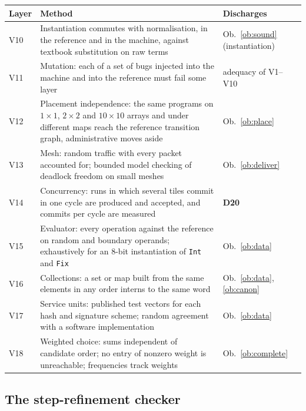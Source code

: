 \documentclass[11pt]{article}
\newcommand{\kw}[1]{\texttt{#1}}
\newcommand{\dec}[1]{\textbf{D#1}}
\theoremstyle{definition}
\theoremstyle{remark}
\begin{document}
\medskip\noindent
\begin{tabularx}{\textwidth}{@{}l X X@{}}
\toprule
Layer & Method & Discharges\\
\midrule
V10 & Instantiation commutes with normalisation, in the reference and in the
     machine, against textbook substitution on raw terms
     & Ob.~\ref{ob:sound} (instantiation)\\
V11 & Mutation: each of a set of bugs injected into the machine and into the
     reference must fail some layer & adequacy of V1--V10\\
V12 & Placement independence: the same programs on $1 \times 1$,
     $2 \times 2$ and $10 \times 10$ arrays and under different maps reach the
     reference transition graph, administrative moves aside
     & Ob.~\ref{ob:place}\\
V13 & Mesh: random traffic with every packet accounted for; bounded model
     checking of deadlock freedom on small meshes & Ob.~\ref{ob:deliver}\\
V14 & Concurrency: runs in which several tiles commit in one cycle are
     produced and accepted, and commits per cycle are measured
     & \dec{20}\\
V15 & Evaluator: every operation against the reference on random and
     boundary operands; exhaustively for an 8-bit instantiation of \kw{Int}
     and \kw{Fix} & Ob.~\ref{ob:data}\\
V16 & Collections: a set or map built from the same elements in any order
     interns to the same word & Ob.~\ref{ob:data}, \ref{ob:canon}\\
V17 & Service units: published test vectors for each hash and signature
     scheme; random agreement with a software implementation & Ob.~\ref{ob:data}\\
V18 & Weighted choice: sums independent of candidate order; no entry of
     nonzero weight is unreachable; frequencies track weights & Ob.~\ref{ob:complete}\\
\bottomrule
\end{tabularx}

\subsection{The step-refinement checker}
\end{document}
